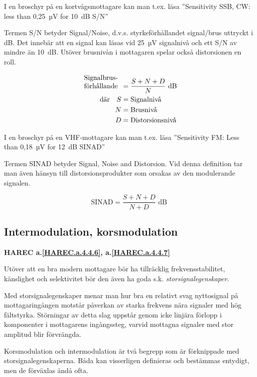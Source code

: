 I en broschyr på en kortvågsmottagare kan man t.ex. läsa
''Sensitivity SSB, CW: less than 0,25~µV for 10~dB S/N''

Termen S/N betyder Signal/Noise, d.v.s. styrkeförhållandet signal/brus
uttryckt i dB.
Det innebär att en signal kan läsas vid 25~µV signalnivå och ett S/N av mindre
än 10~dB.
Utöver brusnivån i mottagaren spelar också distorsionen en roll.

\begin{align*}
  \begin{array}[b]{l}
    \text{Signalbrus-} \\
    \text{förhållande}
  \end{array} &= \frac{S + N + D}{N} \text{ dB} \\
  \text{där} \quad S &= \text{Signalnivå} \\
  N &= \text{Brusnivå} \\
  D &= \text{Distorsionsnivå} \\
\end{align*}

I en broschyr på en VHF-mottagare kan man t.ex. läsa
''Sensitivity FM: Less than 0,18~µV for 12~dB SINAD''

Termen SINAD betyder Signal, Noise and Distorsion.
Vid denna definition tar man även hänsyn till distorsionsprodukter som orsakas
av den modulerande signalen.

\[
\text{SINAD} = \frac{S+N+D}{N+D}\text{ dB}
\]

\subsection{Intermodulation, korsmodulation}
\textbf{HAREC
  a.\ref{HAREC.a.4.4.6}\label{myHAREC.a.4.4.6},
  a.\ref{HAREC.a.4.4.7}\label{myHAREC.a.4.4.7}
}

Utöver att en bra modern mottagare bör ha tillräcklig frekvensstabilitet,
känslighet och selektivitet bör den även ha goda s.k.
\emph{storsignalegenskaper}.

Med storsignalegenskaper menar man hur bra en relativt svag nyttosignal på
mottagaringången motstår påverkan av starka frekvens nära signaler med hög
fältstyrka.
Störningar av detta slag uppstår genom icke linjära förlopp i komponenter i
mottagarens ingångssteg, varvid mottagna signaler med stor amplitud blir
förvrängda.

Korsmodulation och intermodulation är två begrepp som är förknippade
med storsignalegenskaperna.
Båda kan visserligen definieras och bestämmas entydigt, men de förväxlas ändå
ofta.

